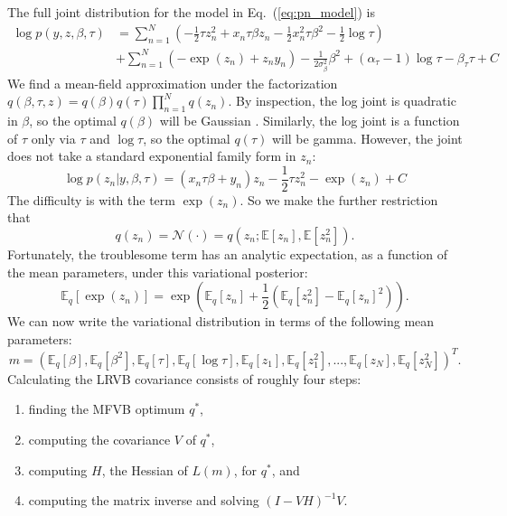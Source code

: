 \documentclass{article}\usepackage[]{graphicx}\usepackage[]{color}
\newcommand{\eq}[1]{Eq.~(\ref{eq:#1})}
\newcommand{\gauss}{\mathcal{N}} %
\newcommand{\vbcov}{V} %
\newcommand{\constant}{C} %
\theoremstyle{plain}
\newcommand{\mbe}{\mathbb{E}}
\newcommand{\mbeq}{\mathbb{E}_{q}}
\begin{document}
The full joint distribution for the model in \eq{pn_model} is
%
\begin{align*}
\log p\left(y,z,\beta,\tau\right) &= \sum_{n=1}^{N}\left(-\frac{1}{2}\tau z_{n}^{2}+x_{n}\tau\beta z_{n}-\frac{1}{2}x_{n}^{2}\tau\beta^{2}-\frac{1}{2}\log\tau\right)\\
 &+\sum_{n=1}^{N}\left(-\exp\left(z_{n}\right)+z_{n}y_{n}\right)
 -\frac{1}{2\sigma_{\beta}^{2}}\beta^{2}+\left(\alpha_{\tau}-1\right)\log\tau-\beta_{\tau}\tau+\constant
\end{align*}
%
We find a mean-field approximation under the factorization
$q\left(\beta,\tau,z\right) =
q\left(\beta\right)q\left(\tau\right)\prod_{n=1}^{N}q\left(z_{n}\right)$. By
inspection, the log joint is quadratic in $\beta$, so the optimal
$q\left(\beta\right)$ will be Gaussian \citep{bishop:2006:pattern}. Similarly, the
log joint is a function of $\tau$ only via $\tau$ and $\log\tau$, so the optimal
$q\left(\tau\right)$ will be gamma. However, the joint does not take a standard
exponential family form in $z_n$:
%
$$
  \log p\left(z_{n}\vert y,\beta,\tau\right) = \left(x_{n}\tau\beta+y_{n}\right)z_{n}-\frac{1}{2}\tau z_{n}^{2}-\exp\left(z_{n}\right)+\constant
$$
%
The difficulty is with the term $\exp\left(z_{n}\right)$. So we make the further
restriction that
%
$$
  q\left(z_{n}\right) = \gauss\left(\cdot\right)=q\left(z_{n};\mbe\left[z_{n}\right],\mbe\left[z_{n}^{2}\right]\right).
$$
%
Fortunately, the troublesome term has an analytic expectation, as
a function of the mean parameters, under this variational posterior:
%
$$
  \mbeq\left[\exp\left(z_{n}\right)\right] = \exp\left(\mbeq\left[z_{n}\right]+\frac{1}{2}\left(\mbeq\left[z_{n}^{2}\right]-\mbeq\left[z_{n}\right]^{2}\right)\right).
$$
%
We can now write the variational distribution in terms of the following
mean parameters:
%
$$
  m = \left(\mbeq\left[\beta\right],\mbeq\left[\beta^{2}\right],\mbeq\left[\tau\right],\mbeq\left[\log\tau\right],\mbeq\left[z_{1}\right],\mbeq\left[z_{1}^{2}\right],...,\mbeq\left[z_{N}\right],\mbeq\left[z_{N}^{2}\right]\right)^{T}.
$$
%
Calculating the LRVB covariance consists of roughly four steps:

\begin{enumerate}
\item finding the MFVB optimum $q^{*}$,
\item computing the covariance $\vbcov$ of $q^*$,
\item computing $H$, the Hessian of $L(m)$, for $q^*$, and
\item computing the matrix inverse and solving $\left(I-VH\right)^{-1}V$.
\end{enumerate}
\end{document}
